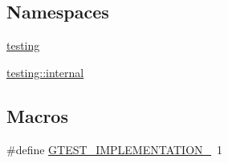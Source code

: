 \subsection*{Namespaces}
\begin{DoxyCompactItemize}
\item 
 \hyperlink{namespacetesting}{testing}
\item 
 \hyperlink{namespacetesting_1_1internal}{testing\+::internal}
\end{DoxyCompactItemize}
\subsection*{Macros}
\begin{DoxyCompactItemize}
\item 
\#define \hyperlink{gtest-death-test_8cc_a83bd232fd1077579fada92c31bb7469f}{G\+T\+E\+S\+T\+\_\+\+I\+M\+P\+L\+E\+M\+E\+N\+T\+A\+T\+I\+O\+N\+\_\+}~1
\end{DoxyCompactItemize}
